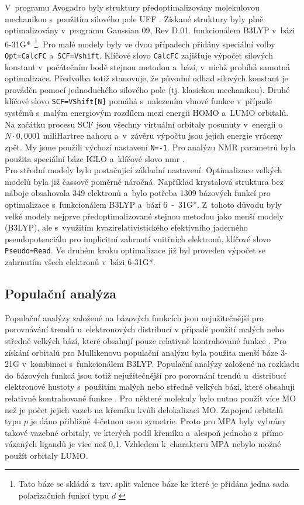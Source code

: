 \documentclass[
digital, %
table,   %
nolof,     %
nolot,     %
oneside,
]{fithesis3}
\begin{document}
V~programu Avogadro byly struktury předoptimalizovány molekulovou mechanikou s~použitím silového pole UFF \cite{uff_force_filed}. Získané struktury byly plně optimalizovány v~programu Gaussian 09, Rev D.01. \cite{g09} funkcionálem B3LYP \cite{b3lyp} v~bázi 6-31G*~\footnote{Tato báze se skládá z~tzv. split valence báze \cite{ditchfield1971self} ke které je přidána jedna sada polarizačních funkcí typu $d$ \cite{francl1982self}}. Pro malé modely byly ve dvou případech přidány speciální volby \texttt{Opt=CalcFC} a~\texttt{SCF=Vshift}. Klíčové slovo \texttt{CalcFC} zajišťuje výpočet silových konstant v~počátečním bodě stejnou metodou a~bází, v~nichž probíhá samotná optimalizace. Předvolba totiž stanovuje, že původní odhad silových konstant je prováděn pomocí jednoduchého silového pole (tj. klasickou mechanikou). Druhé klíčové slovo \texttt{SCF=VShift[N]} pomáhá s~nalezením vlnové funkce v~případě systémů s~malým energiovým rozdílem mezi energii HOMO a~LUMO orbitalů. Na začátku procesu SCF jsou všechny virtuální orbitaly posunuty v~energii o~$N \cdot 0,0001$ miliHartree nahoru a~v~závěru výpočtu jsou jejich energie vráceny zpět. My jsme použili výchozí nastavení \texttt{N=-1}. Pro analýzu NMR parametrů byla použita speciální báze IGLO \cite{iglo} a~klíčové slovo nmr \cite{g09}. \\
Pro střední modely bylo postačující základní nastavení. Optimalizace velkých modelů byla již čassově poměrně náročná. Například krystalová struktura bez náboje obsahovala 349 elektronů a~bylo potřeba 1309 bázových funkcí pro optimalizace s~funkcionálem B3LYP a~bází 6~-~31G*. Z~tohoto důvodu byly velké modely nejprve předoptimalizované stejnou metodou jako menší modely (B3LYP), ale s~využitím kvazirelativistického efektivního jaderného pseudopotenciálu pro implicitní zahrnutí vnitřních elektronů, klíčové slovo \texttt{Pseudo=Read}. Ve druhém kroku optimalizace již byl proveden výpočet se zahrnutím všech elektronů v~bázi 6-31G*.\\
\subsection{Populační analýza}
Populační analýzy založené na bázových funkcích jsou nejužitečnější pro porovnávání trendů u~elektronových distribucí v případě použití malých nebo středně velkých bází, které obsahují pouze relativně kontrahované funkce \cite{jensen2007introduction}.
Pro získání orbitalů pro Mullikenovu populační analýzu byla použita menší báze 3-21G \cite{binkley1980self} v~kombinaci s~funkcionálem B3LYP. Populační analýzy založené na rozkladu do bázových funkcá jsou totiž nejužitečnější pro porovnání trendů u~distribucí elektronové hustoty s~použitím malých nebo středně velkých bází, které obsahuji relativně kontrahované funkce \cite{jensen2007introduction}. Pro některé molekuly bylo nutno použít více MO než je počet
jejich vazeb na křemíku kvůli delokalizaci MO. Zapojení orbitalů typu $p$ je dáno
přibližně 4-četnou osou symetrie. Proto pro MPA byly
vybrány takové vazebné orbitaly, ve kterých podíl křemíku a~alespoň
jednoho z~přímo vázaných ligandů je více než 0,1. Vzhledem k~charakteru
MPA nebylo možné použít orbitaly LUMO. \\
\end{document}
